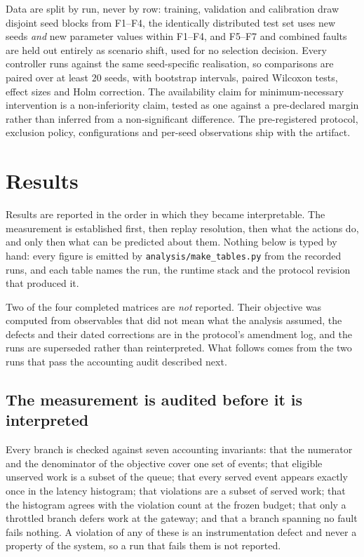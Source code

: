 \documentclass[journal]{IEEEtran}
\begin{document}
Data are split by run, never by row: training, validation and calibration draw
disjoint seed blocks from F1--F4, the identically distributed test set uses new
seeds \emph{and} new parameter values within F1--F4, and F5--F7 and combined
faults are held out entirely as scenario shift, used for no selection decision.
Every controller runs against the same seed-specific realisation, so comparisons
are paired over at least $20$ seeds, with bootstrap intervals, paired Wilcoxon
tests, effect sizes and Holm correction. The availability claim for
minimum-necessary intervention is a non-inferiority claim, tested as one against
a pre-declared margin rather than inferred from a non-significant difference.
The pre-registered protocol, exclusion policy, configurations and per-seed
observations ship with the artifact.



\section{Results}
\label{sec:results}

Results are reported in the order in which they became interpretable. The
measurement is established first, then replay resolution, then what the actions
do, and only then what can be predicted about them. Nothing below is typed by
hand: every figure is emitted by \texttt{analysis/make\_tables.py} from the
recorded runs, and each table names the run, the runtime stack and the protocol
revision that produced it.

Two of the four completed matrices are \emph{not} reported. Their objective was
computed from observables that did not mean what the analysis assumed, the
defects and their dated corrections are in the protocol's amendment log, and the
runs are superseded rather than reinterpreted. What follows comes from the two
runs that pass the accounting audit described next.

\subsection{The measurement is audited before it is interpreted}
\label{sec:results-audit}

Every branch is checked against seven accounting invariants: that the numerator
and the denominator of the objective cover one set of events; that eligible
unserved work is a subset of the queue; that every served event appears exactly
once in the latency histogram; that violations are a subset of served work; that
the histogram agrees with the violation count at the frozen budget; that only a
throttled branch defers work at the gateway; and that a branch spanning no fault
fails nothing. A violation of any of these is an instrumentation defect and
never a property of the system, so a run that fails them is not reported.
\end{document}
